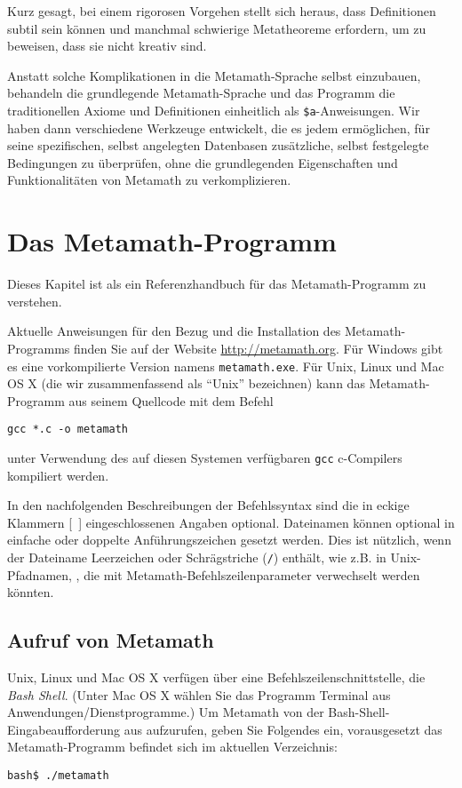 Kurz gesagt, bei einem rigorosen Vorgehen stellt sich heraus, dass Definitionen subtil sein können und manchmal schwierige Metatheoreme erfordern, um zu beweisen, dass sie nicht kreativ sind. 

Anstatt solche Komplikationen in die Metamath-Sprache selbst einzubauen, behandeln die grundlegende Metamath-Sprache und das Programm die traditionellen Axiome und Definitionen einheitlich als \texttt{\$a}-Anweisungen. Wir haben dann verschiedene Werkzeuge entwickelt, die es jedem ermöglichen, für seine spezifischen, selbst angelegten Datenbasen zusätzliche, selbst festgelegte Bedingungen zu überprüfen, ohne die grundlegenden Eigenschaften und Funktionalitäten von Metamath zu verkomplizieren. 

\chapter{Das Metamath-Programm}\label{commands}

Dieses Kapitel ist als ein Referenzhandbuch für das Metamath-Programm zu verstehen.

Aktuelle Anweisungen für den Bezug und die Installation des Metamath-Programms finden Sie auf der Website \url{http://metamath.org}. Für Windows gibt es eine vorkompilierte Version namens \texttt{metamath.exe}.  Für Unix, Linux und Mac OS X (die wir zusammenfassend als "`Unix"' bezeichnen) kann das Metamath-Programm aus seinem Quellcode mit dem Befehl 
\begin{verbatim} 
gcc *.c -o metamath 
\end{verbatim} 
unter Verwendung des auf diesen Systemen verfügbaren \texttt{gcc} {\sc c}-Compilers kompiliert werden. 

In den nachfolgenden Beschreibungen der Befehlssyntax sind die in eckige Klammern [\ ] eingeschlossenen Angaben optional.  Dateinamen können optional in einfache oder doppelte Anführungszeichen gesetzt werden.  Dies ist nützlich, wenn der Dateiname Leerzeichen oder Schrägstriche (\texttt{/}) enthält, wie z.B. in Unix-Pfadnamen, , die mit Metamath-Befehlszeilenparameter verwechselt werden könnten.

\section{Aufruf von Metamath}

Unix, Linux und Mac OS X verfügen über eine Befehlszeilenschnittstelle, die  {\em Bash Shell}.  (Unter Mac OS X wählen Sie das Programm Terminal aus Anwendungen/Dienstprogramme.) Um Metamath von der Bash-Shell-Eingabeaufforderung aus aufzurufen, geben Sie Folgendes ein, vorausgesetzt das Metamath-Programm befindet sich im aktuellen Verzeichnis: 
\begin{verbatim} 
bash$ ./metamath 
\end{verbatim} 

